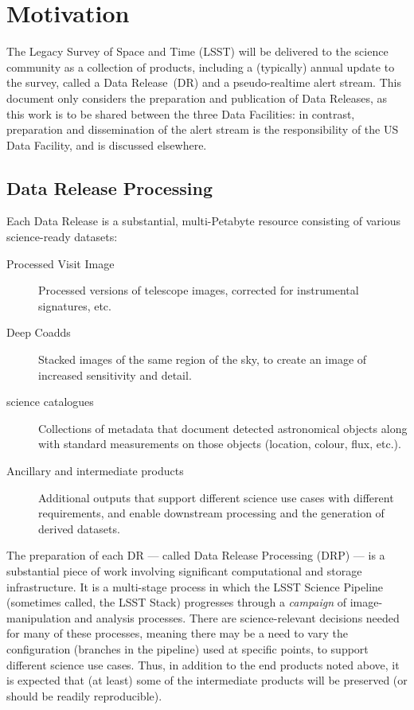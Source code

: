 \section{Motivation}
\label{sec:motivation}

The Legacy Survey of Space and Time (LSST) will be delivered to the science community as a collection of products, including a (typically) annual update to the survey, called a Data Release~(DR) and a pseudo-realtime alert stream. This document only considers the preparation and publication of Data Releases, as this work is to be shared between the three Data Facilities: in contrast, preparation and dissemination of the alert stream is the responsibility of the US Data Facility, and is discussed elsewhere.

\subsection{Data Release Processing}

Each Data Release is a substantial, multi-Petabyte resource consisting of various science-ready datasets:

\begin{description}

\item[Processed Visit Image] Processed versions of telescope images, corrected for instrumental signatures, etc.

\item[Deep Coadds] Stacked images of the same region of the sky, to create an image of increased sensitivity and detail.

\item[science catalogues] Collections of metadata that document detected astronomical objects along with standard measurements on those objects (location, colour, flux, etc.).

\item[Ancillary and intermediate products] Additional outputs that support different science use cases with different requirements, and enable downstream processing and the generation of derived datasets.

\end{description}

The preparation of each DR --- called Data Release Processing (DRP) --- is a substantial piece of work involving significant computational and storage infrastructure. It is a multi-stage process in which the LSST Science Pipeline (sometimes called, the LSST Stack) progresses through a {\em campaign} of image-manipulation and analysis processes. There are science-relevant decisions needed for many of these processes, meaning there may be a need to vary the configuration (branches in the pipeline) used at specific points, to support different science use cases. Thus, in addition to the end products noted above, it is expected that (at least) some of the intermediate products will be preserved (or should be readily reproducible).

